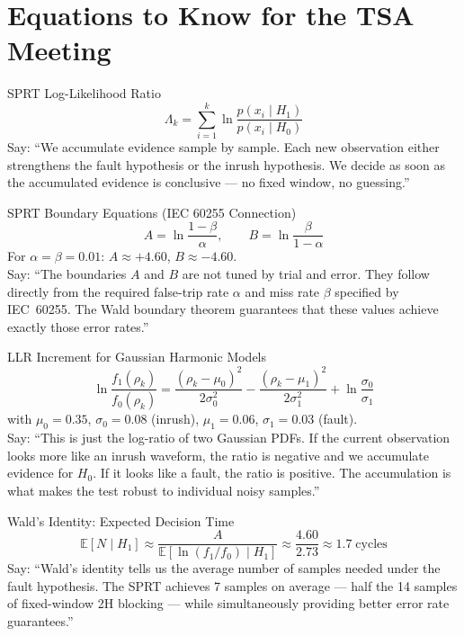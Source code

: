 \documentclass[12pt,a4paper]{article}
\begin{document}
\section{Equations to Know for the TSA Meeting}

\begin{formulabox}{SPRT Log-Likelihood Ratio}
\[
  \Lambda_k = \sum_{i=1}^{k} \ln \frac{p(x_i \mid H_1)}{p(x_i \mid H_0)}
\]
Say: ``We accumulate evidence sample by sample. Each new observation either strengthens the fault hypothesis or the inrush hypothesis. We decide as soon as the accumulated evidence is conclusive --- no fixed window, no guessing.''
\end{formulabox}

\begin{formulabox}{SPRT Boundary Equations (IEC 60255 Connection)}
\[
  A = \ln\!\frac{1-\beta}{\alpha}, \qquad B = \ln\!\frac{\beta}{1-\alpha}
\]
For $\alpha = \beta = 0.01$: $A \approx +4.60$, $B \approx -4.60$.\\
Say: ``The boundaries $A$ and $B$ are not tuned by trial and error. They follow directly from the required false-trip rate $\alpha$ and miss rate $\beta$ specified by IEC~60255. The Wald boundary theorem guarantees that these values achieve exactly those error rates.''
\end{formulabox}

\begin{formulabox}{LLR Increment for Gaussian Harmonic Models}
\[
  \ln\frac{f_1(\rho_k)}{f_0(\rho_k)} =
    \frac{(\rho_k - \mu_0)^2}{2\sigma_0^2}
    - \frac{(\rho_k - \mu_1)^2}{2\sigma_1^2}
    + \ln\frac{\sigma_0}{\sigma_1}
\]
with $\mu_0=0.35$, $\sigma_0=0.08$ (inrush), $\mu_1=0.06$, $\sigma_1=0.03$ (fault).\\
Say: ``This is just the log-ratio of two Gaussian PDFs. If the current observation looks more like an inrush waveform, the ratio is negative and we accumulate evidence for $H_0$. If it looks like a fault, the ratio is positive. The accumulation is what makes the test robust to individual noisy samples.''
\end{formulabox}

\begin{formulabox}{Wald's Identity: Expected Decision Time}
\[
  \mathbb{E}[N \mid H_1] \approx \frac{A}{\mathbb{E}[\ln(f_1/f_0) \mid H_1]}
  \approx \frac{4.60}{2.73} \approx 1.7\;\text{cycles}
\]
Say: ``Wald's identity tells us the average number of samples needed under the fault hypothesis. The SPRT achieves 7 samples on average --- half the 14 samples of fixed-window 2H blocking --- while simultaneously providing better error rate guarantees.''
\end{formulabox}
\end{document}
